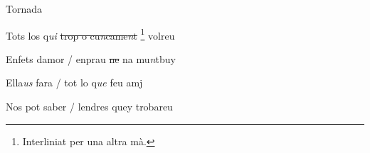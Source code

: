 \documentclass[12pt]{article}
\begin{document}
\begin{estrofaExtra}%




\begin{tornada}

Tornada

\end{tornada}


\end{estrofaExtra}


\begin{estrofa}

 Tots los q\textit{ui} \sout{trop o cu\textit{n}came\textit{n}t} \footnote{Interliniat per una altra m\`{a}.} volreu

 Enfets damor / enprau \sout{ne} na mu\textit{n}tbuy

 Ella\textit{us} fara / tot lo q\textit{ue} feu amj

 Nos pot saber / lendres quey trobareu

\end{estrofa}
\end{document}
